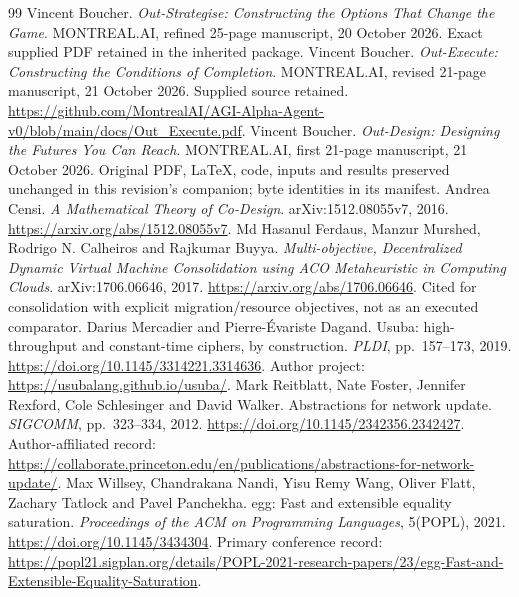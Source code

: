 \documentclass[11pt,letterpaper]{article}
\theoremstyle{definition}\newtheorem{definition}[theorem]{Definition}
\theoremstyle{remark}\newtheorem{remark}[theorem]{Remark}
\begin{document}
\begin{thebibliography}{99}
Vincent Boucher. \emph{Out-Strategise: Constructing the Options That Change the Game}. MONTREAL.AI, refined 25-page manuscript, 20 October 2026. Exact supplied PDF retained in the inherited package.
Vincent Boucher. \emph{Out-Execute: Constructing the Conditions of Completion}. MONTREAL.AI, revised 21-page manuscript, 21 October 2026. Supplied source retained. \url{https://github.com/MontrealAI/AGI-Alpha-Agent-v0/blob/main/docs/Out_Execute.pdf}.
Vincent Boucher. \emph{Out-Design: Designing the Futures You Can Reach}. MONTREAL.AI, first 21-page manuscript, 21 October 2026. Original PDF, LaTeX, code, inputs and results preserved unchanged in this revision's companion; byte identities in its manifest.
Andrea Censi. \emph{A Mathematical Theory of Co-Design}. arXiv:1512.08055v7, 2016. \url{https://arxiv.org/abs/1512.08055v7}.
Md Hasanul Ferdaus, Manzur Murshed, Rodrigo N. Calheiros and Rajkumar Buyya. \emph{Multi-objective, Decentralized Dynamic Virtual Machine Consolidation using ACO Metaheuristic in Computing Clouds}. arXiv:1706.06646, 2017. \url{https://arxiv.org/abs/1706.06646}. Cited for consolidation with explicit migration/resource objectives, not as an executed comparator.
Darius Mercadier and Pierre-\'Evariste Dagand. Usuba: high-throughput and constant-time ciphers, by construction. \emph{PLDI}, pp.~157--173, 2019. \url{https://doi.org/10.1145/3314221.3314636}. Author project: \url{https://usubalang.github.io/usuba/}.
Mark Reitblatt, Nate Foster, Jennifer Rexford, Cole Schlesinger and David Walker. Abstractions for network update. \emph{SIGCOMM}, pp.~323--334, 2012. \url{https://doi.org/10.1145/2342356.2342427}. Author-affiliated record: \url{https://collaborate.princeton.edu/en/publications/abstractions-for-network-update/}.
Max Willsey, Chandrakana Nandi, Yisu Remy Wang, Oliver Flatt, Zachary Tatlock and Pavel Panchekha. egg: Fast and extensible equality saturation. \emph{Proceedings of the ACM on Programming Languages}, 5(POPL), 2021. \url{https://doi.org/10.1145/3434304}. Primary conference record: \url{https://popl21.sigplan.org/details/POPL-2021-research-papers/23/egg-Fast-and-Extensible-Equality-Saturation}.
\end{thebibliography}
\end{document}
